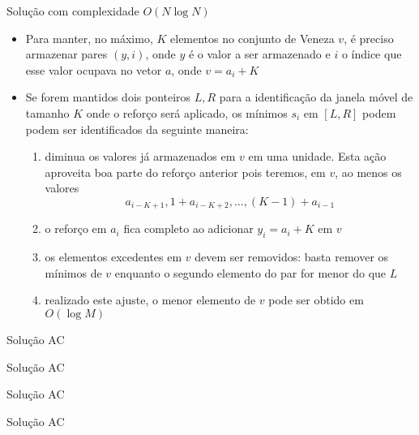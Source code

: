 \begin{frame}[fragile]{Solução com complexidade $O(N\log N)$}

    \begin{itemize}
        \item Para manter, no máximo, $K$ elementos no conjunto de Veneza $v$, é preciso armazenar pares
            $(y, i)$, onde $y$ é o valor a ser armazenado e $i$ o índice que esse valor ocupava no
            vetor $a$, onde $v = a_i + K$

        \item Se forem mantidos dois ponteiros $L, R$ para a identificação da janela móvel de tamanho
            $K$ onde o reforço será aplicado, os mínimos $s_i$ em $[L, R]$ podem podem ser identificados
            da seguinte maneira:
            \begin{enumerate}
                \item diminua os valores já armazenados em $v$ em uma unidade. Esta ação aproveita boa
                    parte do reforço anterior pois teremos, em $v$, ao menos os valores
                    $$
                        a_{i - K + 1}, 1 + a_{i - K + 2}, \ldots, (K - 1) + a_{i - 1}
                    $$
                \item o reforço em $a_i$ fica completo ao adicionar $y_i = a_i + K$ em $v$
                \item os elementos excedentes em $v$ devem ser removidos: basta remover os mínimos de 
                    $v$ enquanto o segundo elemento do par for menor do que $L$
                \item realizado este ajuste, o menor elemento de $v$ pode ser obtido em $O(\log M)$
            \end{enumerate}
    \end{itemize}

\end{frame}
 
\begin{frame}[fragile]{Solução AC}
\end{frame}

\begin{frame}[fragile]{Solução AC}
\end{frame}

\begin{frame}[fragile]{Solução AC}
\end{frame}

\begin{frame}[fragile]{Solução AC}
\end{frame}
